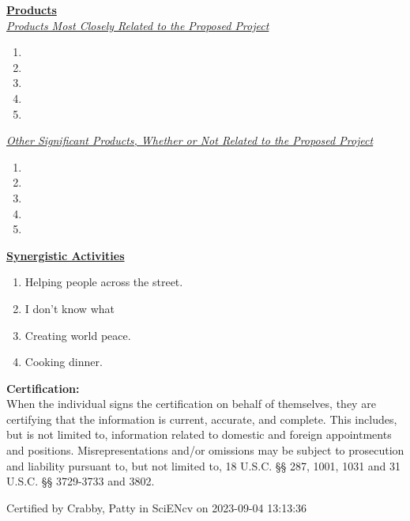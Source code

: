 \documentclass[11pt]{article}
\begin{document}
\noindent
{\bf \underline{Products}} \\
{\em \underline{Products Most Closely Related to the Proposed Project}}
\begin{enumerate}
\item
{}
\item
{}
\item
{}
\item
{}
\item
{}
\end{enumerate}

\noindent
{\em \underline{Other Significant Products, Whether or Not Related to the Proposed Project}}
\begin{enumerate}
\item
{}
\item
{}
\item
{}
\item
{}
\item
{}
\end{enumerate}

\noindent
{\bf \underline{Synergistic Activities}}
\vspace{-0.4\baselineskip}
\begin{enumerate}
\item Helping people across the street.
\item I don't know what
\item Creating world peace.
\item Cooking dinner.
\end{enumerate}

\noindent
{\bf Certification:}\\
When the individual signs the certification on behalf of themselves, they are certifying that the information is current, accurate, and complete. This includes, but is not limited to, information related to domestic and foreign appointments and positions. Misrepresentations and/or omissions may be subject to prosecution and liability pursuant to, but not limited to, 18 U.S.C. §§ 287, 1001, 1031 and 31 U.S.C. §§ 3729-3733 and 3802.

\vspace{\baselineskip}
\noindent
Certified by Crabby, Patty in SciENcv on 2023-09-04 13:13:36
\end{document}
